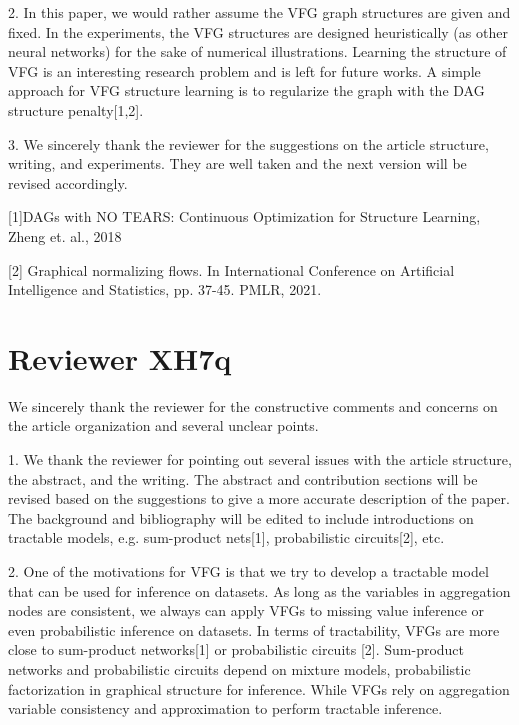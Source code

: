 \documentclass{article}
\begin{document}
2.
 In this paper,  we would rather assume the VFG graph structures are given and fixed.  In the experiments, the VFG structures are designed heuristically (as other neural networks) for the sake of numerical illustrations.  Learning the structure of VFG is an interesting research problem and is left for future works. A simple approach for VFG structure learning is to regularize the graph with the DAG structure penalty[1,2]. 

3. We sincerely thank the reviewer for the suggestions on the article structure, writing, and experiments. They are well taken and the next version will be revised accordingly. 

 

[1]DAGs with NO TEARS: Continuous Optimization for Structure Learning, Zheng et. al., 2018

[2] Graphical normalizing flows. In International Conference on Artificial Intelligence and Statistics, pp. 37-45. PMLR, 2021.


\section{Reviewer XH7q}
We sincerely thank the reviewer for the constructive comments and concerns on the article organization and several unclear points. 

1.
 We thank the reviewer for pointing out several issues with the article structure, the abstract, and the writing. The abstract and contribution sections will be revised based on the suggestions to give a more accurate description of the paper.  The background and bibliography will be edited to include introductions on tractable models, e.g. sum-product nets[1], probabilistic circuits[2], etc. 


2. 
One of the motivations for VFG is that we try to develop a tractable model that can be used for inference on datasets. As long as the variables in aggregation nodes are consistent, we always can apply VFGs to missing value inference or even probabilistic inference on datasets. In terms of tractability, VFGs are more close to sum-product networks[1] or probabilistic circuits [2]. Sum-product networks and probabilistic circuits depend on mixture models, probabilistic factorization in graphical structure for inference. While VFGs rely on aggregation variable consistency and approximation to perform tractable inference.  
\end{document}
